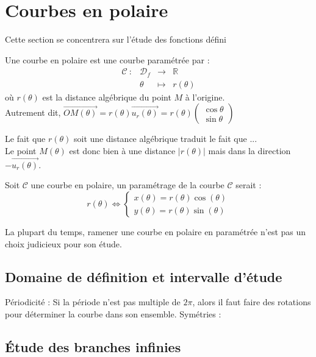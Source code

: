 \section{Courbes en polaire}
Cette section se concentrera sur l'étude des fonctions défini
\begin{defi}
Une courbe en polaire est une courbe paramétrée par :
$$\begin{array}{cccc}
    \mathscr{C} \ : & \mathscr{D}_{f} & \to & \mathbb{R} \\
         & \theta & \mapsto & r(\theta)
\end{array}$$
où $r(\theta)$ est la distance algébrique du point $M$ à l'origine.\\
Autrement dit, $\overrightarrow{OM(\theta)}=r(\theta)\overrightarrow{u_r(\theta)}=r(\theta)\begin{pmatrix}\cos\theta\\\sin\theta\end{pmatrix}$
\end{defi}
Le fait que $r(\theta)$ soit une distance algébrique traduit le fait que ...\\
Le point $M(\theta)$ est donc bien à une distance $|r(\theta)|$ mais dans la direction $-\overrightarrow{u_r(\theta)}$.
\begin{prop}
Soit $\mathscr{C}$ une courbe en polaire, un paramétrage de la courbe $\mathscr{C}$ serait :
$$r(\theta)\Leftrightarrow\begin{cases}x(\theta)=r(\theta)\cos(\theta)\\y(\theta)=r(\theta)\sin(\theta)\end{cases}$$
\end{prop}
La plupart du temps, ramener une courbe en polaire en paramétrée n'est pas un choix judicieux pour son étude.
\subsection{Domaine de définition et intervalle d'étude}
Périodicité :
Si la période n'est pas multiple de $2\pi$, alors il faut faire des rotations pour déterminer la courbe dans son ensemble.
Symétries :

\subsection{Étude des branches infinies}

